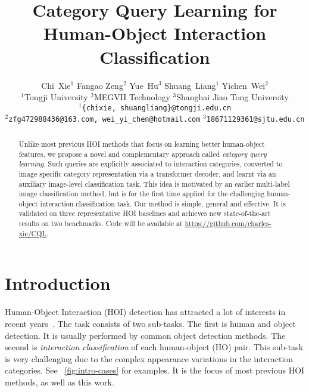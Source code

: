 \documentclass[10pt,twocolumn,letterpaper]{article}
\begin{document}
\title{Category Query Learning for Human-Object Interaction Classification}

\author{
Chi~Xie$^1$\footnotemark[2] \quad
Fangao Zeng$^{2}$\footnotemark[3] \quad
Yue~Hu$^3$\footnotemark[3] \quad
Shuang~Liang$^{1}$\footnotemark[1] \quad
Yichen~Wei$^{2}$\footnotemark[3] \\
$^{1}${Tongji University} \quad
$^{2}${MEGVII Technology} \quad
$^{3}${Shanghai Jiao Tong University} \\
$^{1}${\tt\small \{chixie, shuangliang\}@tongji.edu.cn} \\ \quad
$^{2}${\tt\small zfg472988436@163.com, wei\_yi\_chen@hotmail.com} \quad
$^{3}${\tt\small 18671129361@sjtu.edu.cn} \\
}

\maketitle

\renewcommand{\thefootnote}{\fnsymbol{footnote}}

\begin{abstract}
Unlike most previous HOI methods that focus on learning better human-object features, we propose a novel and complementary approach called \emph{category query learning}. Such queries are explicitly associated to interaction categories, converted to image specific category representation via a transformer decoder, and learnt via an auxiliary image-level classification task. This idea is motivated by an earlier multi-label image classification method, but is for the first time applied for the challenging human-object interaction classification task. Our method is simple, general and effective. It is validated on three representative HOI baselines and achieves new state-of-the-art results on two benchmarks. Code will be available at \url{https://github.com/charles-xie/CQL}.
\end{abstract}

\section{Introduction}
\label{sec:intro}
Human-Object Interaction (HOI) detection has attracted a lot of interests in recent years~\cite{gupta2015visual, chao2018learning, gkioxari2018detecting, gao2018ican, liao2020ppdm, tamura2021qpic}. The task consists of two sub-tasks. The first is human and object detection. It is usually performed by common object detection methods. The second is \emph{interaction classification} of each human-object (HO) pair. This sub-task is very challenging due to the complex appearance variations in the interaction categories. See ~\cref{fig:intro-cases} for examples. It is the focus of most previous HOI methods, as well as this work.
\end{document}
